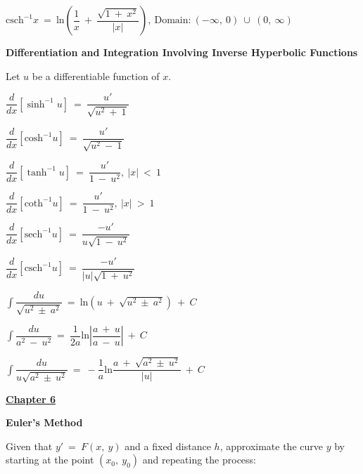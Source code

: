 \documentclass{article}
\begin{document}
\begin{large}
\hspace{0.1in} $\text{csch}^{-1}x\ =\ \text{ln}\left(\dfrac{1}{x}\ +\ \dfrac{\sqrt{1\ +\ x^{2}}}{|x|}\right),\ \text{Domain:}\ (-\infty,\ 0)\ \cup\ (0,\ \infty)$

\textbf{Differentiation and Integration Involving Inverse Hyperbolic Functions}

\hspace{0.1in} Let $u$ be a differentiable function of $x$.

\hspace{0.2in} $\dfrac{d}{dx}[\sinh ^{-1}u]\ =\ \dfrac{u'}{\sqrt{u^{2}\ +\ 1}}$

\hspace{0.2in} $\dfrac{d}{dx}[\text{cosh}^{-1}u]\ =\ \dfrac{u'}{\sqrt{u^{2}\ -\ 1}}$

\hspace{0.2in} $\dfrac{d}{dx}[\tanh ^{-1}u]\ =\ \dfrac{u'}{1\ -\ u^{2}},\ |x|\ <\ 1$

\hspace{0.2in} $\dfrac{d}{dx}[\text{coth}^{-1}u]\ =\ \dfrac{u'}{1\ -\ u^{2}},\ |x|\ >\ 1$

\hspace{0.2in} $\dfrac{d}{dx}[\text{sech}^{-1}u]\ =\ \dfrac{-u'}{u\sqrt{1\ -\ u^{2}}}$

\hspace{0.2in} $\dfrac{d}{dx}[\text{csch}^{-1}u]\ =\ \dfrac{-u'}{|u|\sqrt{1\ +\ u^{2}}}$

\hspace{0.2in} $\displaystyle\int\dfrac{du}{\sqrt{u^{2}\ \pm\ a^{2}}}\ =\ \text{ln}(u\ +\ \sqrt{u^{2}\ \pm\ a^{2}})\ +\ C$

\hspace{0.2in} $\displaystyle\int\dfrac{du}{a^{2}\ -\ u^{2}}\ =\ \dfrac{1}{2a}\text{ln}\left|\dfrac{a\ +\ u}{a\ -\ u}\right|\ +\ C$

\hspace{0.2in} $\displaystyle\int\dfrac{du}{u\sqrt{a^{2}\ \pm\ u^{2}}}\ =\ -\dfrac{1}{a}\text{ln}\dfrac{a\ +\ \sqrt{a^{2}\ \pm\ u^{2}}}{|u|}\ +\ C$

\vspace{0.25in}

\underline{\textbf{\huge Chapter 6 \phantom{ } \phantom{ } \phantom{ } \phantom{ }}}

\vspace{-0.1in}
\textbf{Euler's Method}

\vspace{-0.2in}
\hspace{0.1in} {\large Given that $y'\ =\ F(x,\ y)$ and a fixed distance $h$, approximate the curve $y$ by starting at the point $(x_{0},\ y_{0})$ and repeating the process:}


\end{large}
\end{document}
